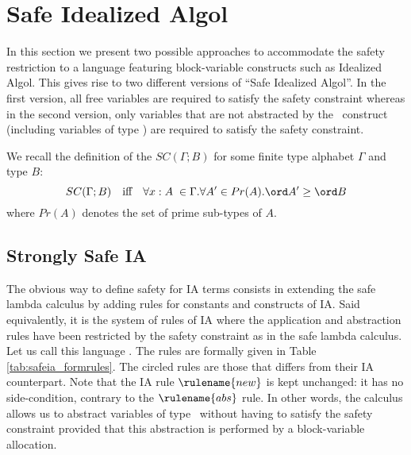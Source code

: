 

\section{Safe Idealized Algol}

In this section we present two possible approaches to accommodate
the safety restriction to a language featuring block-variable constructs such as Idealized Algol. This gives rise to two
different versions of ``Safe Idealized Algol''. In the first
version, all free variables are required to satisfy the safety
constraint whereas in the second version, only variables that are
not abstracted by the \ianew\ construct (including variables of type
\iavar) are required to satisfy the safety constraint.

We recall the definition of the  $SC(\Gamma ; B)$
for some finite type alphabet $\Gamma$ and type $B$:
$$SC(\Gamma ; B) \quad \mbox{iff} \quad  \forall x:A\; \in \Gamma . \forall A' \in Pr(A) . \ord A' \geq \ord B$$
where $Pr(A)$ denotes the set of prime sub-types of $A$.



\subsection{Strongly Safe IA}

 The obvious way to define safety for IA terms consists in extending the safe lambda calculus by adding rules
 for constants and constructs of IA.
Said equivalently, it is the system of rules of IA where the
application and abstraction rules  have been restricted by the
safety constraint as in the safe lambda calculus. Let us call this
language . The rules are formally given in
Table \ref{tab:safeia_formrules}. The circled rules are those that
differs from their IA counterpart. Note that the IA rule $\rulename{new}$ is kept unchanged: it has no side-condition, contrary to the $\rulename{abs}$ rule. In other words, the calculus allows us to abstract variables of type \iavar\ without having to satisfy the safety constraint provided that this abstraction is performed by a block-variable allocation.


